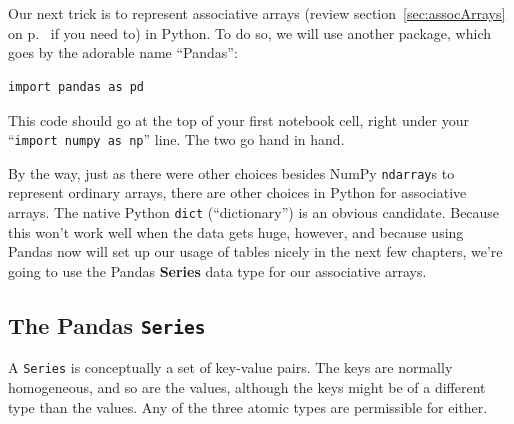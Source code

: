 

\chapter[Assoc.~arrays in Python (1 of 3)]{\LARGE\selectfont{Associative
arrays in Python (1 of 3)}}
\label{ch:assocArraysInPython1}


Our next trick is to represent associative arrays (review
section~\ref{sec:assocArrays} on p.~\pageref{sec:assocArrays} if you need to)
in Python. To do so, we will use another package, which goes by the adorable
name ``Pandas'':

\begin{Verbatim}[fontsize=\small,samepage=true,frame=single,framesep=3mm]
import pandas as pd
\end{Verbatim}

This code should go at the top of your first notebook cell, right under your
``\texttt{import numpy as np}'' line. The two go hand in hand.


By the way, just as there were other choices besides NumPy \texttt{ndarray}s to
represent ordinary arrays, there are other choices in Python for associative
arrays. The native Python \texttt{dict} (``dictionary'') is an obvious
candidate. Because this won't work well when the data gets huge, however, and
because using Pandas now will set up our usage of tables nicely in the next
few chapters, we're going to use the Pandas \textbf{Series} data type for our
associative arrays.


\section{The Pandas \texttt{Series}}
\label{sec:creatingSeries}


A \texttt{Series} is conceptually a set of key-value pairs. The keys are
normally homogeneous, and so are the values, although the keys might be of a
different type than the values. Any of the three atomic types are permissible
for either.


